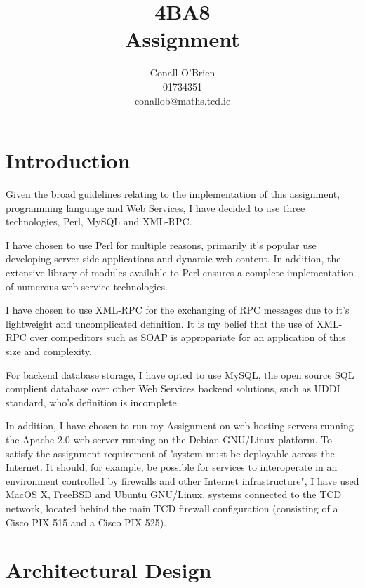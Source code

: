 \documentclass[a4paper,10pt]{article}
\begin{document}
\title{4BA8 \\ Assignment}

\author{Conall O'Brien \\ 01734351 \\ conallob@maths.tcd.ie}

\maketitle

\section{Introduction}

Given the broad guidelines relating to the implementation of this 
assignment,  programming language and Web Services, I have decided to 
use three technologies, Perl, MySQL and XML-RPC.


I have chosen to use Perl for multiple reasons, primarily it's
popular use developing server-side applications and dynamic web content.
In addition, the extensive library of modules available to Perl ensures
a complete implementation of numerous web service technologies.


I have chosen to use XML-RPC for the exchanging of RPC messages due to
it's lightweight and uncomplicated definition. It is my belief that the 
use of XML-RPC over compeditors such as SOAP is appropariate for an
application of this size and complexity.


For backend database storage, I have opted to use MySQL, the open source
SQL complient database over other Web Services backend solutions, such 
as UDDI standard, who's definition is incomplete.


In addition, I have chosen to run my Assignment on web hosting servers
running the Apache 2.0 web server running on the Debian GNU/Linux
platform. To satisfy the assignment requirement of "system must be 
deployable across the Internet. It should, for example, be possible for 
services to interoperate in an environment controlled by firewalls and 
other Internet infrastructure", I have used MacOS X, FreeBSD and Ubuntu 
GNU/Linux, systems connected to the TCD network, located behind the
main TCD firewall configuration (consisting of a Cisco PIX 515 and a 
Cisco PIX 525).

\section{Architectural Design}
\end{document}
